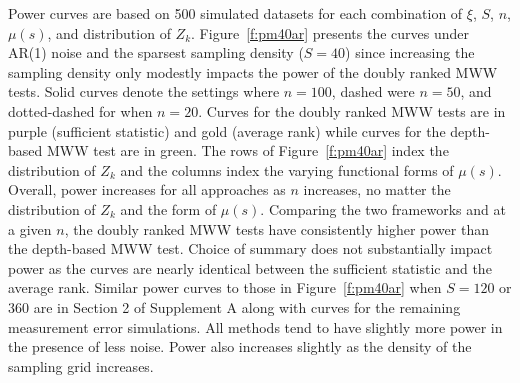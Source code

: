 \documentclass[12pt]{article}
\theoremstyle{plain}
\theoremstyle{remark}
\begin{document}



Power curves are based on 500 simulated datasets for each combination of $\xi$, $S$, $n$, $\mu(s)$, and distribution of $Z_k$. Figure~\ref{f:pm40ar} presents the curves under AR(1) noise and the sparsest sampling density ($S = 40$) since increasing the sampling density only modestly impacts the power of the doubly ranked MWW tests. Solid curves denote the settings where $n = 100$, dashed were $n = 50$, and dotted-dashed for when $n = 20$. Curves for the doubly ranked MWW tests are in purple (sufficient statistic) and gold (average rank) while curves for the depth-based MWW test are in green. The rows of Figure~\ref{f:pm40ar} index the distribution of $Z_k$ and the columns index the varying functional forms of $\mu(s)$. Overall, power increases for all approaches as $n$ increases, no matter the distribution of $Z_k$ and the form of $\mu(s)$. Comparing the two frameworks and at a given $n$, the doubly ranked MWW tests have consistently higher power than the depth-based MWW test. Choice of summary does not substantially impact power as the curves are nearly identical between the sufficient statistic and the average rank. Similar power curves to those in Figure~\ref{f:pm40ar} when $S = 120$ or 360 are in Section 2 of Supplement A \citep{DRTSup2024A} along with curves for the remaining measurement error simulations. All methods tend to have slightly more power in the presence of less noise. Power also increases slightly as the density of the sampling grid increases.
\end{document}
